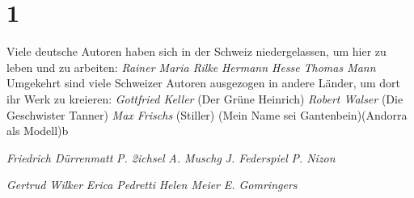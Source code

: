 \section{1}

Viele deutsche Autoren haben sich in der Schweiz niedergelassen, um hier zu leben und zu arbeiten:
\emph{Rainer Maria Rilke}
\emph{Hermann Hesse}
\emph{Thomas Mann}
Umgekehrt sind viele Schweizer Autoren ausgezogen in andere Länder, um dort ihr Werk zu kreieren:
\emph{Gottfried Keller} (Der Grüne Heinrich)
\emph{Robert Walser} (Die Geschwister Tanner)
\emph{Max Frischs} (Stiller) (Mein Name sei Gantenbein)(Andorra als Modell)b

\emph{Friedrich Dürrenmatt}
\emph{P. 2ichsel}
\emph{A. Muschg}
\emph{J. Federspiel}
\emph{P. Nizon}

\emph{Gertrud Wilker}
\emph{Erica Pedretti}
\emph{Helen Meier}
\emph{E. Gomringers}
